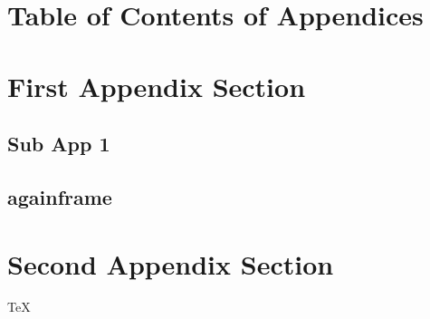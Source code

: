 \beginbackup
\appendix



\section*{Table of Contents of Appendices}

\begin{frame}{\secname}
    \tableofcontents[hideallsubsections,firstsection=3]
\end{frame}

\section{First Appendix Section}
\subsection{Sub App 1}

\begin{frame}{\subsecname}
\end{frame}

\subsection{againframe}

\section{Second Appendix Section}
\begin{frame}{\secname}
    \TeX
\end{frame}

\backupend
